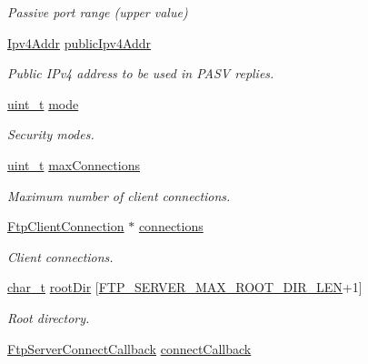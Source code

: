 \begin{DoxyCompactItemize}
\begin{DoxyCompactList}\small\item\em Passive port range (upper value) \end{DoxyCompactList}\item 
\hyperlink{ipv4_8h_a411debb3d770caa0c06d3f73367da37f}{Ipv4\+Addr} \hyperlink{structFtpServerSettings_aa954f00cecd495bc7a3304a9f5e15391}{public\+Ipv4\+Addr}
\begin{DoxyCompactList}\small\item\em Public I\+Pv4 address to be used in P\+A\+SV replies. \end{DoxyCompactList}\item 
\hyperlink{compiler__port_8h_a12a1e9b3ce141648783a82445d02b58d}{uint\+\_\+t} \hyperlink{structFtpServerSettings_a1f29e06ca5ab84bca3197e4a1c3f409b}{mode}
\begin{DoxyCompactList}\small\item\em Security modes. \end{DoxyCompactList}\item 
\hyperlink{compiler__port_8h_a12a1e9b3ce141648783a82445d02b58d}{uint\+\_\+t} \hyperlink{structFtpServerSettings_abd014b45519176c7d629ec4c79b3035a}{max\+Connections}
\begin{DoxyCompactList}\small\item\em Maximum number of client connections. \end{DoxyCompactList}\item 
\hyperlink{ftp__server_8h_ab682699c15473841571a42c3df57e9d2}{Ftp\+Client\+Connection} $\ast$ \hyperlink{structFtpServerSettings_aa978284727ae89147f970d349b7d36b1}{connections}
\begin{DoxyCompactList}\small\item\em Client connections. \end{DoxyCompactList}\item 
\hyperlink{compiler__port_8h_a40bb5262bf908c328fbcfbe5d29d0201}{char\+\_\+t} \hyperlink{structFtpServerSettings_ad2fbe642f13e772c1019f1fc24acf613}{root\+Dir} \mbox{[}\hyperlink{ftp__server_8h_a4ee960ae83791f045dfd014588b30b3d}{F\+T\+P\+\_\+\+S\+E\+R\+V\+E\+R\+\_\+\+M\+A\+X\+\_\+\+R\+O\+O\+T\+\_\+\+D\+I\+R\+\_\+\+L\+EN}+1\mbox{]}
\begin{DoxyCompactList}\small\item\em Root directory. \end{DoxyCompactList}\item 
\hyperlink{ftp__server_8h_a333315b35e4f2859c06be47407822984}{Ftp\+Server\+Connect\+Callback} \hyperlink{structFtpServerSettings_a3ce9af486eb03a9a3fe571778d259e58}{connect\+Callback}

\end{DoxyCompactItemize}
